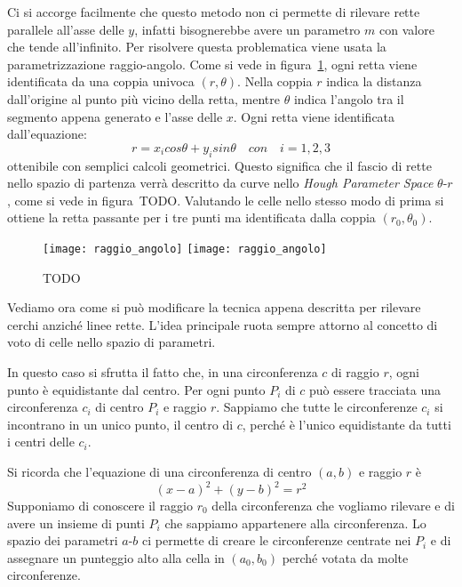 Ci si accorge facilmente che questo metodo non ci permette di rilevare rette parallele all'asse delle $y$, infatti bisognerebbe avere un parametro $m$ con valore che tende all'infinito.
Per risolvere questa problematica viene usata la parametrizzazione raggio-angolo.
Come si vede in figura~\ref{fig:hough_parametr_raggio-angolo}, ogni retta viene identificata da una coppia univoca $(r,\theta)$.
Nella coppia $r$ indica la distanza dall'origine al punto più vicino della retta, mentre $\theta$ indica l'angolo tra il segmento appena generato e l'asse delle $x$.
Ogni retta viene identificata dall'equazione:
\begin{equation} \label{eq:raggio_angolo_parametr}
  r = x_i cos \theta + y_i sin \theta \quad con \quad i=1,2,3
\end{equation}
ottenibile con semplici calcoli geometrici.
Questo significa che il fascio di rette nello spazio di partenza verrà descritto da curve nello \textit{Hough Parameter Space} $\theta$-$r$, come si vede in figura~TODO.
Valutando le celle nello stesso modo di prima si ottiene la retta passante per i tre punti ma identificata dalla coppia $(r_0,\theta_0)$.

\begin{figure}[ht] %
  \begin{center}
    \texttt{[image: raggio\_angolo]}
    \texttt{[image: raggio\_angolo]}
    \label{fig:hough_parametr_raggio-angolo}
    \caption{TODO }
  \end{center}
\end{figure}


Vediamo ora come si può modificare la tecnica appena descritta per rilevare cerchi anziché linee rette.
L'idea principale ruota sempre attorno al concetto di voto di celle nello spazio di parametri.

In questo caso si sfrutta il fatto che, in una circonferenza $c$ di raggio $r$, ogni punto è equidistante dal centro.
Per ogni punto $P_i$ di $c$ può essere tracciata una circonferenza $c_i$ di centro $P_i$ e raggio $r$.
Sappiamo che tutte le circonferenze $c_i$ si incontrano in un unico punto, il centro di $c$, perché è l'unico equidistante da tutti i centri delle $c_i$.

Si ricorda che l'equazione di una circonferenza di centro $(a,b)$ e raggio $r$ è
\begin{equation} \label{eq:circonferenza}
  (x - a)^2 + (y - b)^2 = r^2
\end{equation}
Supponiamo di conoscere il raggio $r_0$ della circonferenza che vogliamo rilevare e di avere un insieme di punti $P_i$ che sappiamo appartenere alla circonferenza.
Lo spazio dei parametri $a$-$b$ ci permette di creare le circonferenze centrate nei $P_i$ e di assegnare un punteggio alto alla cella in $(a_0,b_0)$ perché votata da molte circonferenze.

